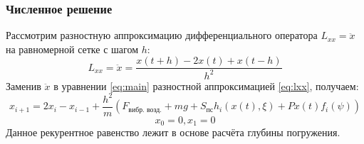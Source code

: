 \documentclass{beamer}
\begin{document}
    \begin{frame}
        \frametitle{Численное решение}
        Рассмотрим разностную аппроксимацию дифференциального оператора $L_{xx} = \ddot{x}$ на равномерной сетке с шагом $h$:
        \begin{equation}
            \label{eq:lxx}
            L_{xx} = \ddot{x} = \frac{x(t + h) - 2x(t) + x(t - h)}{h^2}
        \end{equation}
        Заменив $\ddot{x}$ в уравнении \ref{eq:main} разностной аппроксимацией \ref{eq:lxx}, получаем:
        \begin{equation*}
                x_{i+1} = 2x_i - x_{i-1} + \frac{h^2}{m}(F_\text{вибр. возд.} + mg + S_\text{пс} h_i(x(t), \xi) + P x(t) f_i(\psi))
        \end{equation*}
        \begin{equation*}
            x_0 = 0, x_1 = 0
        \end{equation*}
        Данное рекурентное равенство лежит в основе расчёта глубины погружения.
    \end{frame}
\end{document}
